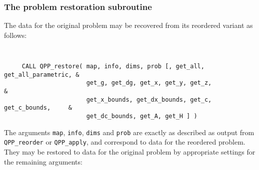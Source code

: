 \documentclass{galahad}
\newcommand{\packagename}{QPP}
\begin{document}

\subsubsection{The  problem restoration subroutine}
The data for the original problem may be recovered from its reordered 
variant as follows:
\vspace*{-2mm}
{\tt 
\begin{verbatim}
     CALL QPP_restore( map, info, dims, prob [, get_all, get_all_parametric, &
                       get_g, get_dg, get_x, get_y, get_z,                   &
                       get_x_bounds, get_dx_bounds, get_c, get_c_bounds,     &
                       get_dc_bounds, get_A, get_H ] )
\end{verbatim}
}
\vspace*{-1mm}
\noindent
The arguments {\tt map}, {\tt info}, {\tt dims} and {\tt prob} are 
exactly as described as output from 
{\tt \packagename\_reorder} or {\tt \packagename\_apply},
and correspond to data for the reordered problem. 
They may be restored to data for the original problem by appropriate 
settings for the remaining arguments: 
\end{document}
